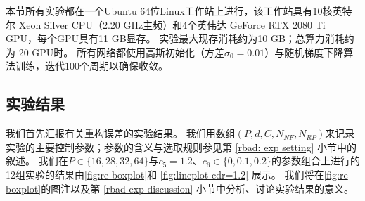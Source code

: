 本节所有实验都在一个Ubuntu 64位Linux工作站上进行，该工作站具有10核英特尔 Xeon Silver CPU（2.20 GHz主频）和4个英伟达 GeForce RTX 2080 Ti GPU，每个GPU具有11 GB显存。
实验最大现存消耗约为10 GB；总算力消耗约为 20 GPU时。
所有网络都使用高斯初始化（方差$\sigma_0 = 0.01$）与随机梯度下降算法训练，迭代$100$个周期以确保收敛。 

\subsection{实验结果}
\label{rbad:main exp results}
我们首先汇报有关重构误差的实验结果。
我们用数组$(P, d, C, N_{NF}, N_{RP})$来记录实验的主要控制参数；参数的含义与选取规则参见第 \ref{rbad: exp setting} 小节中的叙述。
我们在$P \in \{16, 28, 32, 64\}$与$c_5 = 1.2$、$c_6 \in \{0, 0.1, 0.2\}$的参数组合上进行的12组实验的结果由\cref{fig:re boxplot}和 \ref{fig:lineplot cdr=1.2} 展示。
我们将在\cref{fig:re boxplot}的图注以及第 \ref{rbad exp discussion} 小节中分析、讨论实验结果的意义。

